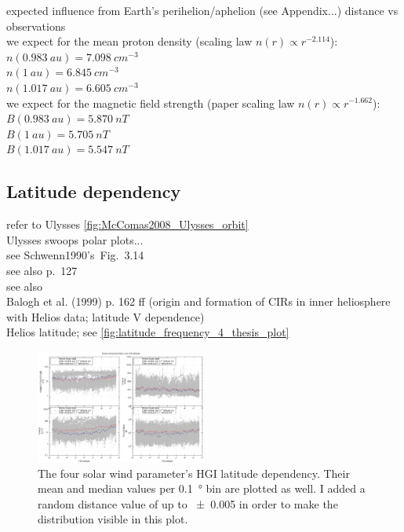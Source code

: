 expected influence from Earth's perihelion/aphelion (see Appendix...) distance vs observations\\
we expect for the mean proton density (scaling law $n(r) \propto r^{-2.114}$):\\
$n(0.983~au) = 7.098~cm^{-3}$\\
$n(1~au) = 6.845~cm^{-3}$\\
$n(1.017~au) = 6.605~cm^{-3}$\\
we expect for the magnetic field strength (paper scaling law $n(r) \propto r^{-1.662}$):\\
$B(0.983~au) = 5.870~nT$\\
$B(1~au) = 5.705~nT$\\
$B(1.017~au) = 5.547~nT$\\


\subsection{Latitude dependency}
refer to Ulysses \autoref{fig:McComas2008_Ulysses_orbit}\\
Ulysses swoops polar plots...\\

see Schwenn1990's~Fig.~3.14\\
see also \citet{Schwenn1990} p.~127\\
see also \citet{Richardson1995}\\
Balogh et al. (1999) p. 162 ff (origin and formation of CIRs in inner heliosphere with Helios data; latitude V dependence)\\

Helios latitude; see \autoref{fig:latitude_frequency_4_thesis_plot}
\begin{figure}[htb]
	\centering
	\includegraphics[width=0.5\textwidth]{figures_of_mine/gnuplots/latitude_frequency_4_thesis_plot.png}
	\caption{The four solar wind parameter's HGI latitude dependency. Their mean and median values per \SI{0.1}{\degree} bin are plotted as well. I added a random distance value of up to \SI{+-0.005}{\au} in order to make the distribution visible in this plot.}
	\label{fig:latitude_frequency_4_thesis_plot}
\end{figure}

